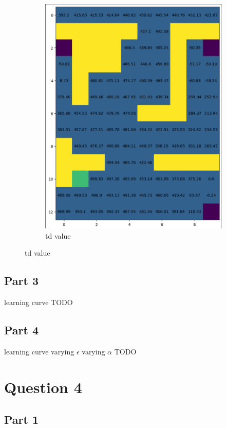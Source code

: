 \documentclass{article}
\begin{document}
\begin{figure}[h]
\begin{subfigure} {0.5\textwidth}
            \includegraphics[width=0.9\linewidth]{images/mc_value}
            \caption{td value}\label{fig:td_value}
        \end{subfigure}
    \end{figure}

    \subsection{Part 3}\label{subsec:question-3-3}
    learning curve
    TODO

    \subsection{Part 4}\label{subsec:question-3-4}
    learning curve
    varying $\epsilon$
    varying $\alpha$
    TODO


    \section{Question 4}\label{sec:question-4}

    \subsection{Part 1}\label{subsec:question-4-1}
\end{document}
